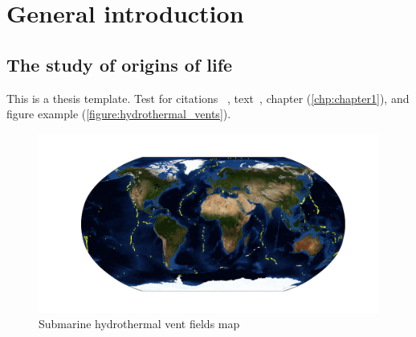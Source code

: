
\chapter{General introduction}\label{chp:chapter1}

\section{The study of origins of life}\label{sec:cp1_ool}
This is a thesis template. Test for citations ~\cite{ref1}, text~\cite{ref2}, chapter (\autoref{chp:chapter1}), and figure example (\autoref{figure:hydrothermal_vents}).

\begin{figure}[h]
	\centering
	\includegraphics[width=1\textwidth]{Figures/hydrothermal_vents.pdf}
	\caption{Submarine hydrothermal vent fields map}
	\label{figure:hydrothermal_vents}
\end{figure}

\renewcommand{\bibname}{References}


